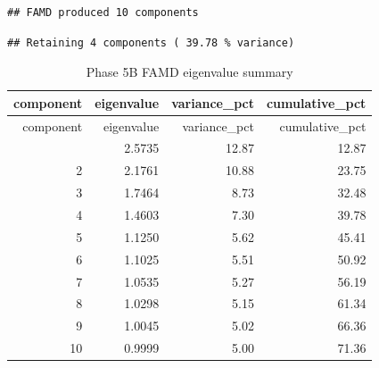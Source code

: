 \documentclass[
]{article}
\newenvironment{Shaded}{\begin{snugshade}}{\end{snugshade}}
\newcommand{\AttributeTok}[1]{\textcolor[rgb]{0.13,0.29,0.53}{#1}}
\newcommand{\CommentTok}[1]{\textcolor[rgb]{0.56,0.35,0.01}{\textit{#1}}}
\newcommand{\ConstantTok}[1]{\textcolor[rgb]{0.56,0.35,0.01}{#1}}
\newcommand{\DecValTok}[1]{\textcolor[rgb]{0.00,0.00,0.81}{#1}}
\newcommand{\FunctionTok}[1]{\textcolor[rgb]{0.13,0.29,0.53}{\textbf{#1}}}
\newcommand{\NormalTok}[1]{#1}
\newcommand{\OtherTok}[1]{\textcolor[rgb]{0.56,0.35,0.01}{#1}}
\newcommand{\SpecialCharTok}[1]{\textcolor[rgb]{0.81,0.36,0.00}{\textbf{#1}}}
\newcommand{\StringTok}[1]{\textcolor[rgb]{0.31,0.60,0.02}{#1}}
\begin{document}
\begin{verbatim}
## FAMD produced 10 components
\end{verbatim}

\begin{Shaded}
\end{Shaded}

\begin{verbatim}
## Retaining 4 components ( 39.78 % variance)
\end{verbatim}

\begin{Shaded}
\end{Shaded}

\begin{longtable}[]{@{}rrrr@{}}
\caption{Phase 5B FAMD eigenvalue summary}\tabularnewline
\toprule\noalign{}
component & eigenvalue & variance\_pct & cumulative\_pct \\
\midrule\noalign{}
\endfirsthead
\toprule\noalign{}
component & eigenvalue & variance\_pct & cumulative\_pct \\
\midrule\noalign{}
\endhead
\bottomrule\noalign{}
\endlastfoot
1 & 2.5735 & 12.87 & 12.87 \\
2 & 2.1761 & 10.88 & 23.75 \\
3 & 1.7464 & 8.73 & 32.48 \\
4 & 1.4603 & 7.30 & 39.78 \\
5 & 1.1250 & 5.62 & 45.41 \\
6 & 1.1025 & 5.51 & 50.92 \\
7 & 1.0535 & 5.27 & 56.19 \\
8 & 1.0298 & 5.15 & 61.34 \\
9 & 1.0045 & 5.02 & 66.36 \\
10 & 0.9999 & 5.00 & 71.36 \\
\end{longtable}
\end{document}
